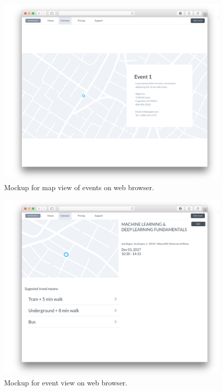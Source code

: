 \documentclass{article}
\begin{document}
	\begin{figure}[!ht]
	\centering
	\includegraphics[height=0.4\textheight]{img/mockups/web/map.png}
	\caption{Mockup for map view of events on web browser.}
	\end{figure}
	\clearpage

	\begin{figure}[!ht]
	\centering
	\includegraphics[height=0.5\textheight]{img/mockups/web/event.png}
	\caption{Mockup for event view on web browser.}
	\end{figure}
	
\end{document}
